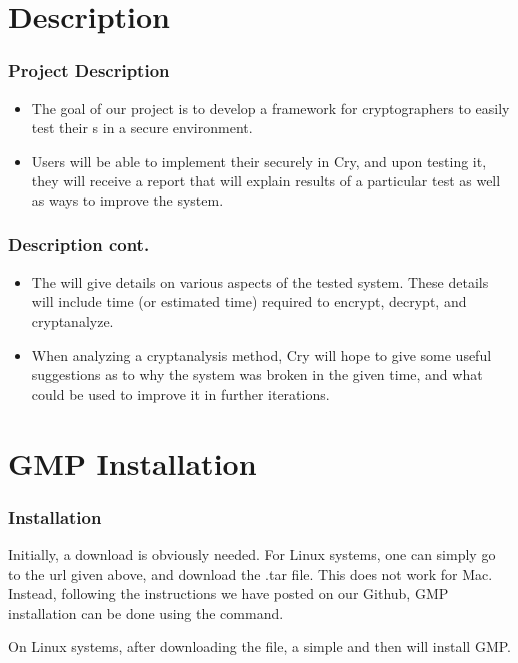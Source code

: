 \section{\cry{} Description}

\begin{frame}
\frametitle{Project Description}
  \begin{itemize}
  \item The goal of our project is to develop a framework for
    cryptographers to easily test their \cs s in a
    secure environment.
  \item Users will be able to implement their
    \cs{} securely in Cry, and upon testing it, they will
    receive a report that will explain results of a particular
    test as well as ways to improve the system.
  \end{itemize}
\end{frame}

\begin{frame}
\frametitle{Description cont.}
  \begin{itemize}
  \item The will give details on various aspects of the tested system.
    These details will include time (or estimated time) required
    to encrypt, decrypt, and cryptanalyze.
  \item When analyzing a
    cryptanalysis method, Cry will hope to give some useful
    suggestions as to why the system was broken in the given
    time, and what could be used to improve it in further
    iterations.
  \end{itemize}
\end{frame}


\section{GMP Installation}

\begin{frame}
\frametitle{Installation}
Initially, a download is obviously needed. For Linux systems, one can simply go to the url
given above, and download the .tar file. This does not work for Mac. Instead, following the
instructions we have posted on our Github, GMP installation can be done using the 
command.

On Linux systems, after downloading the file, a simple  and then 
will install GMP.
\end{frame}

